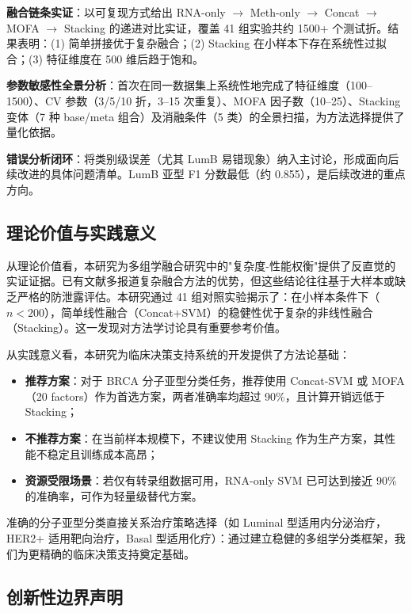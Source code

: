 \textbf{融合链条实证}：以可复现方式给出 RNA-only $\rightarrow$ Meth-only $\rightarrow$ Concat $\rightarrow$ MOFA $\rightarrow$ Stacking 的递进对比实证，覆盖 41 组实验共约 1500+ 个测试折。结果表明：(1) 简单拼接优于复杂融合；(2) Stacking 在小样本下存在系统性过拟合；(3) 特征维度在 500 维后趋于饱和。

\textbf{参数敏感性全景分析}：首次在同一数据集上系统性地完成了特征维度（100--1500）、CV 参数（3/5/10 折，3--15 次重复）、MOFA 因子数（10--25）、Stacking 变体（7 种 base/meta 组合）及消融条件（5 类）的全景扫描，为方法选择提供了量化依据。

\textbf{错误分析闭环}：将类别级误差（尤其 LumB 易错现象）纳入主讨论，形成面向后续改进的具体问题清单。LumB 亚型 F1 分数最低（约 0.855），是后续改进的重点方向。

\subsection{理论价值与实践意义}

从理论价值看，本研究为多组学融合研究中的"复杂度-性能权衡"提供了反直觉的实证证据。已有文献多报道复杂融合方法的优势，但这些结论往往基于大样本或缺乏严格的防泄露评估。本研究通过 41 组对照实验揭示了：在小样本条件下（$n<200$），简单线性融合（Concat+SVM）的稳健性优于复杂的非线性融合（Stacking）。这一发现对方法学讨论具有重要参考价值。

从实践意义看，本研究为临床决策支持系统的开发提供了方法论基础：

\begin{itemize}
    \item \textbf{推荐方案}：对于 BRCA 分子亚型分类任务，推荐使用 Concat-SVM 或 MOFA（20 factors）作为首选方案，两者准确率均超过 90\%，且计算开销远低于 Stacking；
    \item \textbf{不推荐方案}：在当前样本规模下，不建议使用 Stacking 作为生产方案，其性能不稳定且训练成本高昂；
    \item \textbf{资源受限场景}：若仅有转录组数据可用，RNA-only SVM 已可达到接近 90\% 的准确率，可作为轻量级替代方案。
\end{itemize}

准确的分子亚型分类直接关系治疗策略选择（如 Luminal 型适用内分泌治疗，HER2+ 适用靶向治疗，Basal 型适用化疗）：通过建立稳健的多组学分类框架，我们为更精确的临床决策支持奠定基础。

\subsection{创新性边界声明}

